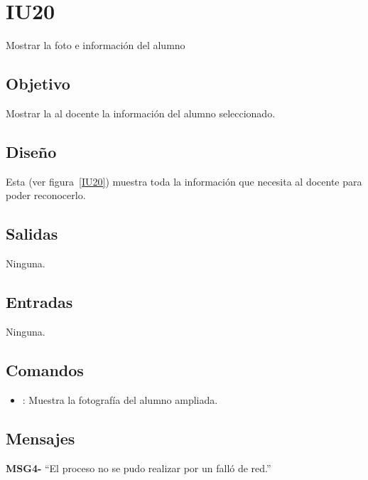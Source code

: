 \section{IU20}{Mostrar la foto e información  del alumno}

\subsection{Objetivo}
    Mostrar la al docente la información del alumno seleccionado.

\subsection{Diseño}
    Esta  (ver figura~\ref{IU20}) muestra toda la información que necesita al docente para poder reconocerlo.


\subsection{Salidas}

    Ninguna.

\subsection{Entradas}
    Ninguna.

\subsection{Comandos}
\begin{itemize}
    \item {}: Muestra la fotografía del alumno ampliada. 
    
\end{itemize}

\subsection{Mensajes}

\begin{Citemize}
    \item {\bf MSG4-} ``El proceso no se pudo realizar por un falló de red.''
\end{Citemize}

